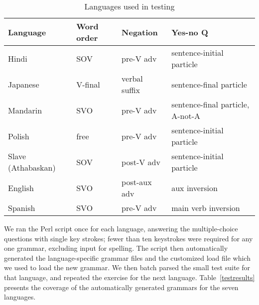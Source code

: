 \documentclass[11pt]{article}
\begin{document}
\begin{table*}[ht]
\begin{center}
\small
\begin{tabular}{llll}
\hline
Language\footnotemark & Word order & Negation & Yes-no Q\footnotemark \\ \hline
Hindi    & SOV        & pre-V adv 	& sentence-initial particle\\
Japanese & V-final    & verbal suffix   & sentence-final particle\\
Mandarin & SVO	      & pre-V adv	& sentence-final particle, A-not-A \\
Polish   & free	      & pre-V adv       & sentence-initial particle  \\
Slave (Athabaskan) & SOV & post-V adv	& sentence-initial particle \\
English  & SVO	      & post-aux adv	& aux inversion \\
Spanish  & SVO	      & pre-V adv	& main verb inversion \\ \hline
\end{tabular}
\end{center}
\caption{Languages used in testing}
\label{testsuitetable}
\end{table*}

\addtocounter{footnote}{-1}
\addtocounter{footnote}{1}

We ran the Perl script once for each language, answering the
multiple-choice questions with single key strokes; fewer than ten
keystrokes were required for any one grammar, excluding input for
spelling.  The script then automatically generated the
language-specific grammar files and the customized load file
which we used to load the new grammar.  We then batch parsed the small
test suite for that language, and repeated the exercise for the next
language.  Table~\ref{testresults} presents the coverage of the
automatically generated grammars for the seven languages.
\end{document}
